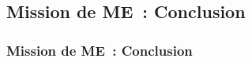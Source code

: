 \subsection{Mission de ME~: Conclusion}
\begin{frame}
	\frametitle{Mission de ME~: Conclusion}
\end{frame}


